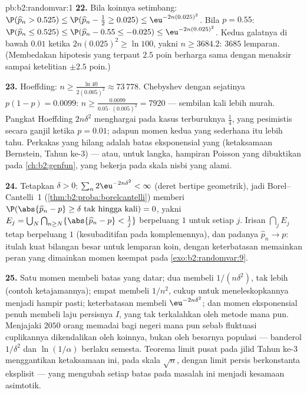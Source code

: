\begin{solution}{pb:b2:randomvar:1}
\textbf{22.} Bila koinnya setimbang: $\P(\widehat p_n > 0.525)
\leq \P(\widehat p_n - \tfrac12 \geq 0.025) \leq
\eu^{-2n(0.025)^2}$. Bila $p = 0.55$: $\P(\widehat p_n \leq
0.525) \leq \P(\widehat p_n - 0.55 \leq -0.025) \leq
\eu^{-2n(0.025)^2}$. Kedua galatnya di bawah $0.01$ ketika
$2n(0.025)^2 \geq \ln 100$, yakni $n \geq 3684.2$: $3685$
lemparan. (Membedakan hipotesis yang terpaut $2.5$ poin berharga
sama dengan menaksir sampai ketelitian $\pm2.5$ poin.)

\textbf{23.} Hoeffding: $n \geq \frac{\ln 40}{2(0.005)^2}
\approx 73\,778$. Chebyshev dengan  sejatinya $p(1-p)
= 0.0099$: $n \geq \frac{0.0099}{0.05\cdot(0.005)^2} =
7920$ --- sembilan kali lebih murah. Pangkat Hoeffding
$2n\delta^2$ menghargai  pada kasus terburuknya $\frac14$,
yang pesimistis secara ganjil ketika $p = 0.01$; adapun momen kedua
yang sederhana itu lebih tahu. Perkakas yang hilang adalah batas
eksponensial yang  (ketaksamaan Bernstein, Tahun ke-3) ---
atau, untuk  langka, hampiran Poisson yang dibuktikan pada
\cref{ch:b2:genfun}, yang bekerja pada skala nisbi yang alami.

\textbf{24.} Tetapkan $\delta > 0$: $\sum_n 2\eu^{-2n\delta^2} <
\infty$ (deret bertipe geometrik), jadi Borel--Cantelli~1
(\cref{thm:b2:proba:borelcantelli}) memberi
$\P(\abs{\widehat p_n - p} \geq \delta \text{ tak hingga
kali}) = 0$, yakni  $E_j =
\bigcup_N\bigcap_{n\geq N}\{\abs{\widehat p_n - p} <
\tfrac1j\}$ berpeluang $1$ untuk setiap $j$. Irisan 
$\bigcap_jE_j$ tetap berpeluang $1$
(kesubaditifan pada komplemennya), dan padanya $\widehat p_n
\to p$: itulah  kuat bilangan besar untuk lemparan koin, dengan
keterbatasan memainkan peran yang dimainkan momen keempat pada
\cref{exo:b2:randomvar:9}.

\textbf{25.} Satu momen membeli batas yang datar; dua membeli
$1/(n\delta^2)$, tak lebih (contoh ketajamannya); empat
membeli $1/n^2$, cukup untuk meneleskopkannya menjadi  hampir pasti;
keterbatasan membeli $\eu^{-2n\delta^2}$; dan momen
eksponensial penuh membeli laju persisnya $I$, yang tak
terkalahkan oleh metode mana pun. Menjajaki $2050$ orang memadai bagi negeri mana pun sebab
fluktuasi cuplikannya dikendalikan oleh  koinnya,
bukan oleh besarnya populasi --- banderol $1/\delta^2$ dan
$\ln(1/\alpha)$ berlaku semesta. Teorema limit pusat pada jilid Tahun ke-3
menggantikan ketaksamaan ini, pada skala
$\sqrt n$, dengan  limit persis berkonstanta eksplisit ---
yang mengubah setiap batas pada masalah ini menjadi
kesamaan asimtotik.

\end{solution}
